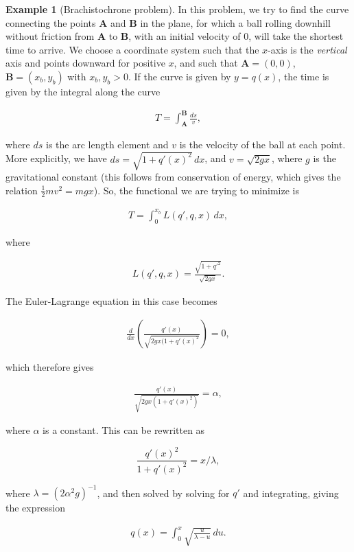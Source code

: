 \documentclass[11pt]{report}
\theoremstyle{plain}
\theoremstyle{definition}
\newtheorem{example}[thm]{Example}
\begin{document}
\begin{example}[Brachistochrone problem]
In this problem, we try to find the curve connecting
the points $\mathbf{A}$ and $\mathbf{B}$ in the
plane, for which a ball rolling downhill without
friction from $\mathbf{A}$ to $\mathbf{B}$, with an
initial velocity of $0$, will take the shortest time
to arrive. We choose a coordinate system such that the
$x$-axis is the \emph{vertical} axis and points downward
for positive $x$, and such that $\mathbf{A}=(0,0)$,
$\mathbf{B}=(x_b,y_b)$ with $x_b,y_b>0$. If the curve
is given by $y=q(x)$, the time is given by the
integral along the curve

\begin{align*}
T = \int_{\mathbf{A}}^{\mathbf{B}} \frac{ds}{v},
\end{align*}

where $ds$ is the arc length element and $v$ is the
velocity of the ball at each point. More explicitly,
we have $ds = \sqrt{1+q'(x)^2}\,dx$, and
$v=\sqrt{2g x}$, where $g$ is the gravitational
constant (this follows from conservation of energy,
which gives the relation $\tfrac12 m v^2 = mgx$). So,
the functional we are trying to minimize is

\begin{align*}
T = \int_0^{x_b} L(q',q,x)\,dx,
\end{align*}

where

\begin{align*}
L(q',q,x) = \frac{\sqrt{1+q'^2}}{\sqrt{2g x}}.
\end{align*}

The Euler-Lagrange equation in this case becomes

\begin{align*}
\frac{d}{dx}\left(\frac{q'(x)}{\sqrt{2 g x(1+q'(x)^2}}\right) = 0,
\end{align*}

which therefore gives

\begin{align*}
\frac{q'(x)}{\sqrt{2 g x(1+q'(x)^2)}} = \alpha,
\end{align*}

where $\alpha$ is a constant. This can be rewritten
as

\[
\frac{q'(x)^2}{1+q'(x)^2} = x/\lambda,
\]

where $\lambda=(2\alpha^2 g)^{-1}$, and then solved
by solving for $q'$ and integrating, giving the
expression

\begin{equation*} \tag{16}\label{eq:cycloidquadrature}
\begin{split}
q(x) = \int_0^x \sqrt{\frac{u}{\lambda-u}}\,du.
\end{split}
\end{equation*}


\end{example}
\end{document}

